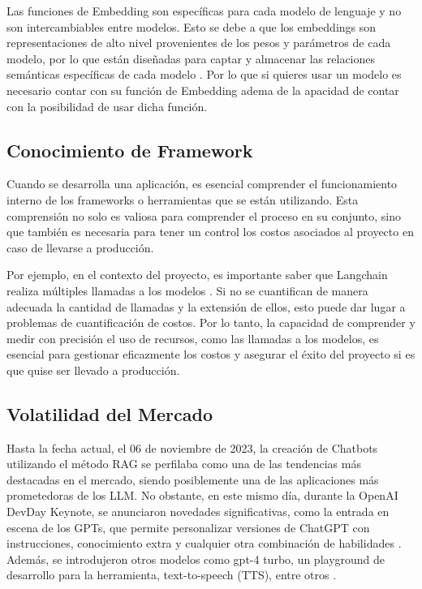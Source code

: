 Las funciones de Embedding son específicas para cada modelo de lenguaje y no son intercambiables entre modelos. Esto se debe a que los embeddings son 
representaciones de alto nivel provenientes de los pesos y parámetros de cada modelo, por lo que están diseñadas para captar y almacenar las relaciones 
semánticas específicas de cada modelo \cite{microsoft1}. Por lo que si quieres usar un modelo es necesario contar con su función de Embedding adema de la 
apacidad de contar con la posibilidad de usar dicha función. 


\subsection{Conocimiento de Framework}
Cuando se desarrolla una aplicación, es esencial comprender el funcionamiento interno de los frameworks o herramientas que se están utilizando. 
Esta comprensión no solo es valiosa para comprender el proceso en su conjunto, sino que también es necesaria para tener un control los costos asociados al 
proyecto en caso de llevarse a producción. 	

Por ejemplo, en el contexto del proyecto, es importante saber que Langchain realiza múltiples llamadas a los modelos \cite{framework1}. Si no se cuantifican de manera adecuada 
la cantidad de llamadas y la extensión de ellos, esto puede dar lugar a problemas de cuantificación de costos. Por lo tanto, la capacidad de comprender y 
medir con precisión el uso de recursos, como las llamadas a los modelos, es esencial para gestionar eficazmente los costos y asegurar el éxito del proyecto 
si es que quise ser llevado a producción.


\subsection{Volatilidad del Mercado}

Hasta la fecha actual, el 06 de noviembre de 2023, la creación de Chatbots utilizando el método RAG se perfilaba como 
una de las tendencias más destacadas en el mercado, siendo posiblemente una de las aplicaciones más prometedoras de los LLM. 
No obstante, en este mismo día, durante la OpenAI DevDay Keynote, se anunciaron novedades significativas, como la entrada en 
escena de los GPTs, que permite personalizar versiones de ChatGPT con instrucciones, conocimiento extra y cualquier otra combinación 
de habilidades \cite{openai2}. Además, se introdujeron otros modelos como gpt-4 turbo, un playground de desarrollo para la herramienta, 
text-to-speech (TTS), entre otros \cite{openai3}.

